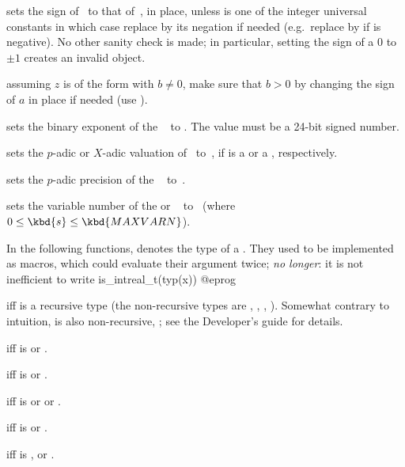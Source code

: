  sets the sign of~ to that
of~, in place, unless  is one of the integer universal
constants in which case replace  by its negation if needed
(e.g.~replace  by  if  is negative). No other
sanity check is made; in particular, setting the sign of a $0$
 to $\pm1$ creates an invalid object.

 assuming $z$ is of the form 
with $b\neq 0$, make sure that $b > 0$ by changing the sign of $a$ in place if
needed (use ).

 sets the binary exponent of the
~ to . The value  must be a 24-bit signed
number.

 sets the $p$-adic or $X$-adic valuation
of~ to~, if  is a  or a ,
respectively.

 sets the $p$-adic precision of the
~ to~.

 sets the variable number of the 
or ~ to~ (where $0\le \kbd{s}\le\kbd{MAXVARN}$).

\label{se:typegroup}
In the following functions,  denotes the type of a .
They used to be implemented as macros, which could evaluate their argument
twice; \emph{no longer}: it is not inefficient to write
\bprog
  is_intreal_t(typ(x))
@eprog

  iff  is a recursive
type (the non-recursive types are , ,
, ). Somewhat contrary to intuition,  is
also non-recursive, ; see the Developer's guide for details.

  iff  is 
or .

  iff  is 
or .

  iff  is 
or  or .

  iff  is 
or .

  iff  is , 
or .

